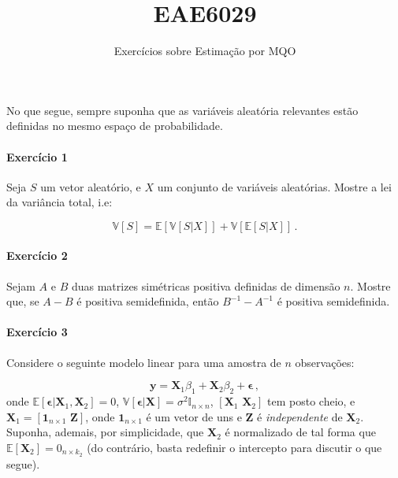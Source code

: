 \documentclass[10pt,a4paper]{article}
\title{EAE6029}
\author{Exercícios sobre Estimação por MQO}
\date{}
\begin{document}
	\maketitle
	No que segue, sempre suponha que as variáveis aleatória relevantes estão definidas no mesmo espaço de probabilidade.
 \paragraph{Exercício 1} Seja $S$ um vetor aleatório, e $X$ um conjunto de variáveis aleatórias. Mostre a lei da variância total, i.e:
 
 $$\mathbb{V}[S] = \mathbb{E}[\mathbb{V}[S|X]] + \mathbb{V}[\mathbb{E}[S|X]]\, .$$

 \paragraph{Exercício 2} Sejam $A$ e $B$ duas matrizes simétricas positiva definidas de dimensão $n$. Mostre que, se $A-B$ é positiva semidefinida, então $B^{-1} - A^{-1}$ é positiva semidefinida.
 
 \paragraph{Exercício 3} Considere o seguinte modelo linear para uma amostra de $n$ observações:
 
 $$\boldsymbol{y} = \boldsymbol{X}_1 \beta_1 + \boldsymbol{X}_2 \beta_2 + \boldsymbol{\epsilon}\,,$$
 onde $\mathbb{E}[\boldsymbol{\epsilon}|\boldsymbol{X}_1,\boldsymbol{X}_2]=0$, $\mathbb{V}[\boldsymbol{\epsilon}|\boldsymbol{X}]=\sigma^2\mathbb{I}_{n\times n}$, $\left[\boldsymbol{X}_1 \, \, \boldsymbol{X}_2\right]$ tem posto cheio, e $\boldsymbol{X}_1 = \left[ \boldsymbol{1}_{n\times 1} \, \, \boldsymbol{Z}\right]$, onde  $\boldsymbol{1}_{n\times 1}  $ é um vetor de uns e $\boldsymbol{Z}$ é \emph{independente} de $\boldsymbol{X}_2$. Suponha, ademais, por simplicidade, que $\boldsymbol{X}_2$ é normalizado de tal forma que $\mathbb{E}[\boldsymbol{X}_2] = 0_{n\times k_2}$ (do contrário, basta redefinir o intercepto para discutir o que segue).
 
\end{document}
